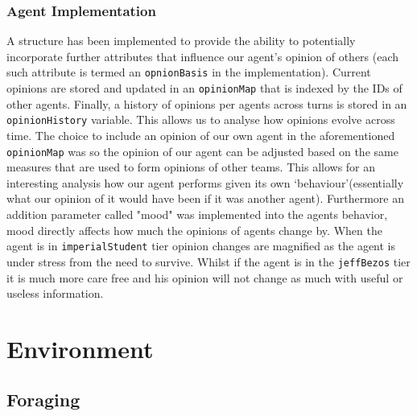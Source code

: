 \subsubsection{Agent Implementation}
A structure has been implemented to provide the ability to potentially incorporate further attributes that influence our agent's opinion of others (each such attribute is termed an \texttt{opnionBasis} in the implementation). Current opinions are stored and updated in an \texttt{opinionMap} that is indexed by the IDs of other agents. Finally, a history of opinions per agents across turns is stored in an \texttt{opinionHistory} variable. This allows us to analyse how opinions evolve across time. The choice to include an opinion of our own agent in the aforementioned \texttt{opinionMap} was so the opinion of our agent can be adjusted based on the same measures that are used to form opinions of other teams. This allows for an interesting analysis how our agent performs given its own `behaviour’(essentially what our opinion of it would have been if it was another agent). Furthermore an addition parameter called "mood" was implemented into the agents behavior, mood directly affects how much the opinions of agents change by. When the agent is in \texttt{imperialStudent} tier opinion changes are magnified as the agent is under stress from the need to survive. Whilst if the agent is in the \texttt{jeffBezos} tier it is much more care free and his opinion will not change as much with useful or useless information. 

\section{Environment}
\subsection{Foraging}
